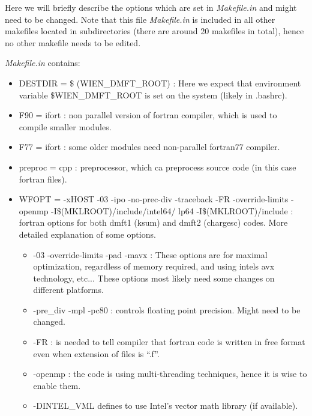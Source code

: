 \documentclass[12 pt]{article}
\begin{document}
  Here we will briefly describe the options which are set in \emph{Makefile.in} and might need to be changed. Note 
that this file \emph{Makefile.in} is included in all other makefiles located in subdirectories (there are around 
20 makefiles in total), hence no other makefile needs to be edited.

  \emph{Makefile.in} contains:

{\color{cyan}
  \begin{itemize}

  \item DESTDIR = \$ (WIEN\_DMFT\_ROOT) : Here we expect that environment variable \$WIEN\_DMFT\_ROOT is set on the 
system (likely in .bashrc).

  \item F90 = ifort : non parallel version of fortran compiler, which is used to compile smaller modules.

  \item F77 = ifort : some older modules need non-parallel fortran77 compiler. 

  \item preproc = cpp : preprocessor, which ca preprocess source code (in this case fortran files).

  \item WFOPT = -xHOST -03 -ipo -no-prec-div -traceback -FR -override-limits -openmp -I\$(MKLROOT)/include/intel64/
lp64 -I\$(MKLROOT)/include : fortran options for both dmft1 (ksum) and dmft2 (chargesc) codes. More detailed 
explanation of some options.

    \begin{itemize}

    \item -03 -override-limits -pad -mavx : These options are for maximal optimization, regardless of memory required, 
and using intels avx technology, etc... These options most likely need some changes on different platforms.

    \item -pre\_div -mpl -pc80 : controls floating point precision. Might need to be changed.

    \item -FR : is needed to tell compiler that fortran code is written in free format even when extension of files 
is ``.f''.

    \item -openmp : the code is using multi-threading techniques, hence it is wise to enable them.

    \item -DINTEL\_VML defines to use Intel's vector math library (if available).


\end{itemize}
\end{itemize}}
\end{document}
